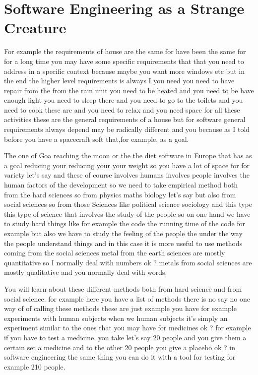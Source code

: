 \documentclass[conference, compsoc, twoside]{IEEEtran}
\begin{document}
\section{Software Engineering as a Strange Creature}

For example the requirements of house are the same for have been the same for for a long time you may have some specific requirements that that you need to address in a specific context because maybe you want more windows etc but in the end the higher level requirements is always I you need you need to have repair from the from the rain unit you need to be heated and you need to be have enough light you need to sleep there and you need to go to the toilets and you need to cook these are and you need to relax and you need space for all these activities these are the general requirements of a house but for software general requirements always depend may be radically different and you because as I told before you have a spacecraft soft that,for example, as a goal.

The one of Goa reaching the moon or the the diet software in Europe that has as a goal reducing your reducing your your weight so you have a lot of space for for variety let's say and these of course involves humans involves people involves the human factors of the development so we need to take empirical method both from the hard sciences so from physics maths biology let's say but also from social sciences so from those Sciences like political science sociology and this type this type of science that involves the study of the people so on one hand we have to study hard things like 
for example the code the running time of the code 
for example but also we have to study the feeling of the people the under the way the people understand things and in this case it is more useful to use methods coming from the social sciences metal from the earth sciences are mostly quantitative 
so I normally deal with numbers ok ? metals from social sciences are mostly qualitative and you normally deal with words. 

You will learn about these different methods both from hard science and from social science.
for example here you have a list of methods there is no say no one way of of calling these methods these are just example you have 
for example experiments with human subjects when we human subjects it's simply an experiment similar to the ones that you may have for medicines ok ? 
for example if you have to test a medicine.
you take let's say 20 people and you give them a certain set a medicine and to the other 20 people you give a placebo ok ? in software engineering the same thing you can do it with a tool for testing 
for example 210 people. 
\end{document}

